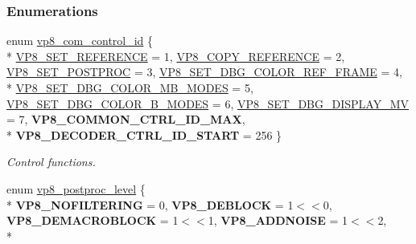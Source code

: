 \subsubsection*{Enumerations}
\begin{DoxyCompactItemize}
\item 
enum \hyperlink{group__vp8_ga8cadbc8e0af3da96ef7a2dbd4ed06599}{vp8\-\_\-com\-\_\-control\-\_\-id} \{ \\*
\hyperlink{group__vp8_gga8cadbc8e0af3da96ef7a2dbd4ed06599a7abc38d739a5ef49c36d9b2cd88e64a6}{V\-P8\-\_\-\-S\-E\-T\-\_\-\-R\-E\-F\-E\-R\-E\-N\-C\-E} = 1, 
\hyperlink{group__vp8_gga8cadbc8e0af3da96ef7a2dbd4ed06599a5375b3ea3a4867d50daee6f5971c7470}{V\-P8\-\_\-\-C\-O\-P\-Y\-\_\-\-R\-E\-F\-E\-R\-E\-N\-C\-E} = 2, 
\hyperlink{group__vp8_gga8cadbc8e0af3da96ef7a2dbd4ed06599a43e85c68bc1c1473f4a94b005a59482c}{V\-P8\-\_\-\-S\-E\-T\-\_\-\-P\-O\-S\-T\-P\-R\-O\-C} = 3, 
\hyperlink{group__vp8_gga8cadbc8e0af3da96ef7a2dbd4ed06599ab52ea7a97668b603812dfc205b0fd783}{V\-P8\-\_\-\-S\-E\-T\-\_\-\-D\-B\-G\-\_\-\-C\-O\-L\-O\-R\-\_\-\-R\-E\-F\-\_\-\-F\-R\-A\-M\-E} = 4, 
\\*
\hyperlink{group__vp8_gga8cadbc8e0af3da96ef7a2dbd4ed06599aa0d5c3eaa7cbecaf64403edc8450b060}{V\-P8\-\_\-\-S\-E\-T\-\_\-\-D\-B\-G\-\_\-\-C\-O\-L\-O\-R\-\_\-\-M\-B\-\_\-\-M\-O\-D\-E\-S} = 5, 
\hyperlink{group__vp8_gga8cadbc8e0af3da96ef7a2dbd4ed06599ae0052b9dd3c64a4bb822abafb4755a87}{V\-P8\-\_\-\-S\-E\-T\-\_\-\-D\-B\-G\-\_\-\-C\-O\-L\-O\-R\-\_\-\-B\-\_\-\-M\-O\-D\-E\-S} = 6, 
\hyperlink{group__vp8_gga8cadbc8e0af3da96ef7a2dbd4ed06599abc6aef0d7e0486d25348de217ad8441d}{V\-P8\-\_\-\-S\-E\-T\-\_\-\-D\-B\-G\-\_\-\-D\-I\-S\-P\-L\-A\-Y\-\_\-\-M\-V} = 7, 
{\bfseries V\-P8\-\_\-\-C\-O\-M\-M\-O\-N\-\_\-\-C\-T\-R\-L\-\_\-\-I\-D\-\_\-\-M\-A\-X}, 
\\*
{\bfseries V\-P8\-\_\-\-D\-E\-C\-O\-D\-E\-R\-\_\-\-C\-T\-R\-L\-\_\-\-I\-D\-\_\-\-S\-T\-A\-R\-T} = 256
 \}
\begin{DoxyCompactList}\small\item\em Control functions. \end{DoxyCompactList}\item 
enum \hyperlink{group__vp8_ga99557e20eb37826e6792cd8819121770}{vp8\-\_\-postproc\-\_\-level} \{ \\*
{\bfseries V\-P8\-\_\-\-N\-O\-F\-I\-L\-T\-E\-R\-I\-N\-G} = 0, 
{\bfseries V\-P8\-\_\-\-D\-E\-B\-L\-O\-C\-K} = 1$<$$<$0, 
{\bfseries V\-P8\-\_\-\-D\-E\-M\-A\-C\-R\-O\-B\-L\-O\-C\-K} = 1$<$$<$1, 
{\bfseries V\-P8\-\_\-\-A\-D\-D\-N\-O\-I\-S\-E} = 1$<$$<$2, 
\\*
$$
\end{DoxyCompactItemize}
